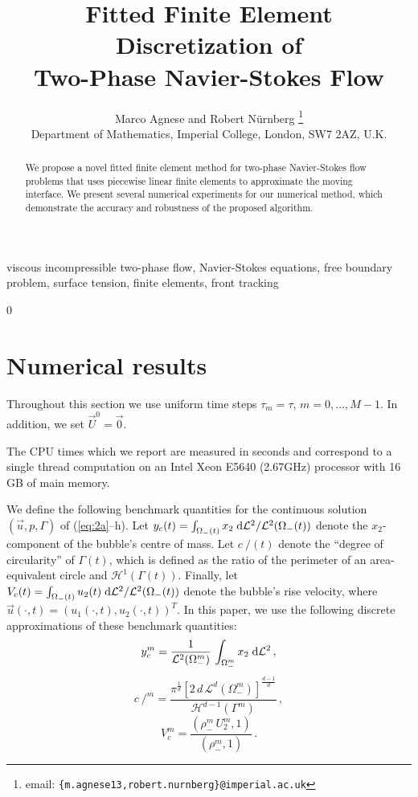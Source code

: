 \documentclass[a4paper,12pt,onecolumn]{article}
\title{Fitted Finite Element Discretization of \\ Two-Phase Navier-Stokes
Flow}
\author{Marco Agnese and Robert N\"urnberg%
\thanks{email: \texttt{\{m.agnese13,robert.nurnberg\}@imperial.ac.uk}}\\
\small
Department of Mathematics, Imperial College, London, SW7 2AZ, U.K.}
\date{}
\newenvironment{keywords}{{\upshape\bfseries Key words. }\ignorespaces}{}
\newcommand{\dL}[1]{\;{\rm d}{\cal L}^{#1}} %
\newcommand{\strikec}{\mbox{$c\!\!\!\!\:/$}}
\begin{document}
\captionsetup[subfigure]{labelformat=empty} %

\maketitle

\begin{abstract}
We propose a novel fitted finite element method for two-phase Navier-Stokes
flow problems that uses piecewise linear finite elements to approximate the
moving interface. We present several numerical experiments for our numerical
method, which demonstrate the accuracy and robustness of the proposed algorithm.
\end{abstract}

\begin{keywords}
viscous incompressible two-phase flow, Navier-Stokes equations,
free boundary problem, surface tension, finite elements, front tracking
\end{keywords}

\setcounter{equation} 0
\section{Numerical results} \label{sec:numerical_results}
Throughout this section we use uniform time steps $\tau_m=\tau$, $m=0,\ldots,
M-1$. In addition, we set $\vec U^0 = \vec 0$.

The CPU times which we report are measured in seconds and correspond to a
single thread computation on an Intel Xeon E5640 (2.67GHz) processor with 16 GB
of main memory.

We define the following benchmark quantities for the continuous solution $(\vec
u, p, \Gamma)$ of
(\ref{eq:2a}--h).
Let $y_c(t) = \int_{\Omega_-(t)} x_2 \dL2 / \mathcal{L}^2(\Omega_-(t))$ denote
the $x_2$-component of the bubble's centre of mass. Let $\strikec(t)$ denote
the ``degree of circularity'' of $\Gamma(t)$, which is defined as the ratio of
the perimeter of an area-equivalent circle and $\mathcal{H}^{1}(\Gamma(t))$.
Finally, let
$V_c(t) = \int_{\Omega_-(t)} u_2(t) \dL2 / \mathcal{L}^2(\Omega_-(t))$
denote the bubble's rise velocity, where
$\vec u(\cdot,t) = (u_1(\cdot,t),u_2(\cdot,t))^T$.
In this paper, we use the following discrete approximations of
these benchmark quantities:
\begin{equation}
y_c^m = \frac1{\mathcal{L}^2(\Omega_-^m)}\,\int_{\Omega_-^m} x_2 \dL2\,,
\end{equation}
\begin{equation}
\strikec^m =
\frac{\pi^{\frac{1}{d}}[2\,d\,\mathcal{L}^d(\Omega_-^m)]^\frac{d-1}{d}}
{\mathcal{H}^{d-1}(\Gamma^m)}\,,
\end{equation}
\begin{equation}
V^m_c = \frac{(\rho^m_-\,U^m_2, 1)}{(\rho^m_-,1)}\,.
\end{equation}
\end{document}
